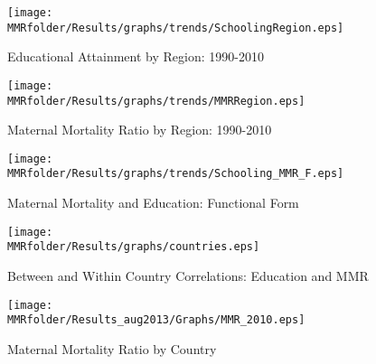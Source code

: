 \begin{figure}[h!]
\begin{center}
\caption{Educational Attainment by Region: 1990-2010}
\label{fig:EducRegion}
\texttt{[image: \\MMRfolder/Results/graphs/trends/SchoolingRegion.eps]} 
\end{center}
\end{figure}

\begin{figure}[h!]
\begin{center}
\caption{Maternal Mortality Ratio by Region: 1990-2010}
\label{fig:MMRRegion}
\texttt{[image: \\MMRfolder/Results/graphs/trends/MMRRegion.eps]} 
\end{center}
\end{figure}

\begin{figure}[h!]
\begin{center}
\caption{Maternal Mortality and Education: Functional Form}
\label{fig:educmmr}
\texttt{[image: \\MMRfolder/Results/graphs/trends/Schooling\_MMR\_F.eps]} 
\end{center}
\end{figure}

\begin{figure}[h!]
\begin{center}
\caption{Between and Within Country Correlations: Education and MMR}
\label{fig:arrows}
\texttt{[image: \\MMRfolder/Results/graphs/countries.eps]} 
\end{center}
\end{figure}


\begin{landscape}
\begin{figure}[h!]
\begin{center}
\caption{Maternal Mortality Ratio by Country}
\label{fig:MMRGlobal}
\texttt{[image: \\MMRfolder/Results\_aug2013/Graphs/MMR\_2010.eps]} 
\end{center}
\end{figure}
\end{landscape}


